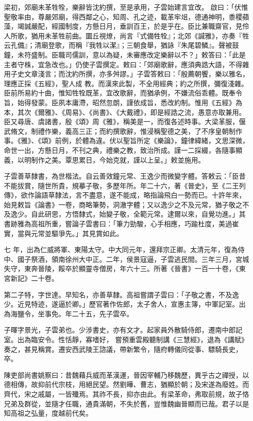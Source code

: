 \begin{pinyinscope}
 梁初，郊廟未革牲牷，樂辭皆沈約撰，至是承用，子雲始建言宜改。
 啟曰：「伏惟聖敬率由，尊嚴郊廟，得西鄰之心，知周、孔之迹，載革牢俎，德通神明，黍稷蘋藻，竭誠嚴配，經國制度，方懸日月，垂訓百王，於是乎在。臣比兼職齋官，見伶人所歌，猶用未革牲前曲。圜丘視燎，尚言『式備牲牷』；北郊《諴雅》，亦奏『牲云孔備』；清廟登歌，而稱『我牲以潔』；三朝食舉，猶詠『朱尾碧鱗』。聲被鼓鐘，未符盛制。臣職司儒訓，意以為疑，未審應改定樂辭以不？」敕答曰：「此是主者守株，宜急改也。」仍使子雲撰定。敕曰：「郊廟歌辭，應須典誥大語，不得雜用子史文章淺言；而沈約所撰，亦多舛謬。」子雲答敕曰：「殷薦朝饗，樂以雅名，理應正採《五經》，聖人成
 教。而漢來此製，不全用經典；約之所撰，彌復淺雜。臣前所易約十曲，惟知牲牷既革，宜改歌辭，而猶承例，不嫌流俗乖體。既奉令旨，始得發蒙。臣夙本庸滯，昭然忽朗，謹依成旨，悉改約制。惟用《五經》為本，其次《爾雅》、《周易》、《尚書》、《大戴禮》，即是經誥之流，愚意亦取兼用。臣又尋唐、虞諸書，殷《頌》周《雅》，稱美是一，而復各述時事。大梁革服，偃武脩文，制禮作樂，義高三正；而約撰歌辭，惟浸稱聖德之美，了不序皇朝制作事。《雅》、《頌》前例，於體為違。伏以聖旨所定《樂論》，鐘律緯緒，文思深微，命世一出，方懸日月，不刊之典，禮樂之教，致治所成。謹一二採綴，各隨事顯
 義，以明制作之美。覃思累日，今始克就，謹以上呈。」敕並施用。



 子雲善草隸書，為世楷法。自云善效鐘元常、王逸少而微變字體。答敕云：「臣昔不能拔賞，隨世所貴，規摹子敬，多歷年所。年二十六，著《晉史》，至《二王列傳》，欲作論語草隸法，言不盡意，遂不能成，略指論飛白一勢而已。十許年來，始見敕旨《論書》一卷，商略筆勢，洞澈字體；又以逸少之不及元常，猶子敬之不及逸少。自此研思，方悟隸式，始變子敬，全範元常。逮爾以來，自覺功進。」其書跡雅為高祖所重，嘗論子雲書曰：「筆力勁駿，心手相應，巧踰杜度，美過崔實，當與元常並驅爭先。」其見賞如此。



 七
 年，出為仁威將軍、東陽太守。中大同元年，還拜宗正卿。太清元年，復為侍中、國子祭酒，領南徐州大中正。二年，侯景寇逼，子雲逃民間。三年三月，宮城失守，東奔晉陵，餒卒於顯靈寺僧房，年六十三。所著《晉書》一百一十卷，《東宮新記》二十卷。



 第二子特，字世達。早知名，亦善草隸。高祖嘗謂子雲曰：「子敬之書，不及逸少。近見特迹，遂逼於卿。」歷官著作佐郎，太子舍人，宣惠主簿，中軍記室。出為海鹽令，坐事免。年二十五，先子雲卒。



 子暉字景光，子雲弟也。少涉書史，亦有文才。起家員外散騎侍郎，遷南中郎記室。出為臨安令。性恬靜，寡嗜好，
 嘗預重雲殿聽制講《三慧經》，退為《講賦》奏之，甚見稱賞。遷安西武陵王諮議，帶新繁令，隨府轉儀同從事、驃騎長史，卒。



 陳吏部尚書姚察曰：昔魏藉兵威而革漢運，晉因宰輔乃移魏歷，異乎古之禪授，以德相傳，故抑前代宗枝，用絕民望。然劉曄、曹志，猶顯於朝；及宋遂為廢姓。而齊代，宋之戚屬，一皆殲焉。其祚不長，抑亦由此。有梁革命，弗取前規，故子恪兄弟及群從，並隨才任職，通貴滿朝，不失於舊，豈惟魏幽晉顯而已哉。君子以是知高祖之弘量，度越前代矣。



\end{pinyinscope}